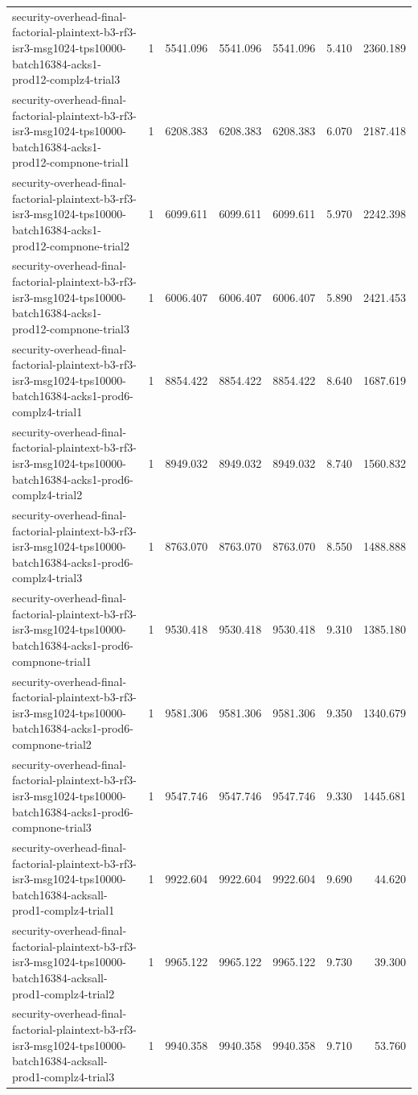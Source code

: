 \begin{tabular}{lrrrrrr}
security-overhead-final-factorial-plaintext-b3-rf3-isr3-msg1024-tps10000-batch16384-acks1-prod12-complz4-trial3 & 1 & 5541.096 & 5541.096 & 5541.096 & 5.410 & 2360.189 \\
security-overhead-final-factorial-plaintext-b3-rf3-isr3-msg1024-tps10000-batch16384-acks1-prod12-compnone-trial1 & 1 & 6208.383 & 6208.383 & 6208.383 & 6.070 & 2187.418 \\
security-overhead-final-factorial-plaintext-b3-rf3-isr3-msg1024-tps10000-batch16384-acks1-prod12-compnone-trial2 & 1 & 6099.611 & 6099.611 & 6099.611 & 5.970 & 2242.398 \\
security-overhead-final-factorial-plaintext-b3-rf3-isr3-msg1024-tps10000-batch16384-acks1-prod12-compnone-trial3 & 1 & 6006.407 & 6006.407 & 6006.407 & 5.890 & 2421.453 \\
security-overhead-final-factorial-plaintext-b3-rf3-isr3-msg1024-tps10000-batch16384-acks1-prod6-complz4-trial1 & 1 & 8854.422 & 8854.422 & 8854.422 & 8.640 & 1687.619 \\
security-overhead-final-factorial-plaintext-b3-rf3-isr3-msg1024-tps10000-batch16384-acks1-prod6-complz4-trial2 & 1 & 8949.032 & 8949.032 & 8949.032 & 8.740 & 1560.832 \\
security-overhead-final-factorial-plaintext-b3-rf3-isr3-msg1024-tps10000-batch16384-acks1-prod6-complz4-trial3 & 1 & 8763.070 & 8763.070 & 8763.070 & 8.550 & 1488.888 \\
security-overhead-final-factorial-plaintext-b3-rf3-isr3-msg1024-tps10000-batch16384-acks1-prod6-compnone-trial1 & 1 & 9530.418 & 9530.418 & 9530.418 & 9.310 & 1385.180 \\
security-overhead-final-factorial-plaintext-b3-rf3-isr3-msg1024-tps10000-batch16384-acks1-prod6-compnone-trial2 & 1 & 9581.306 & 9581.306 & 9581.306 & 9.350 & 1340.679 \\
security-overhead-final-factorial-plaintext-b3-rf3-isr3-msg1024-tps10000-batch16384-acks1-prod6-compnone-trial3 & 1 & 9547.746 & 9547.746 & 9547.746 & 9.330 & 1445.681 \\
security-overhead-final-factorial-plaintext-b3-rf3-isr3-msg1024-tps10000-batch16384-acksall-prod1-complz4-trial1 & 1 & 9922.604 & 9922.604 & 9922.604 & 9.690 & 44.620 \\
security-overhead-final-factorial-plaintext-b3-rf3-isr3-msg1024-tps10000-batch16384-acksall-prod1-complz4-trial2 & 1 & 9965.122 & 9965.122 & 9965.122 & 9.730 & 39.300 \\
security-overhead-final-factorial-plaintext-b3-rf3-isr3-msg1024-tps10000-batch16384-acksall-prod1-complz4-trial3 & 1 & 9940.358 & 9940.358 & 9940.358 & 9.710 & 53.760 \\

\end{tabular}
